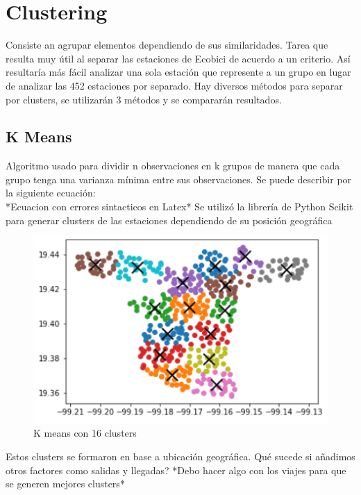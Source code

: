 \documentclass[12pt,spanish]{article}
\begin{document}
	\section{Clustering}
	Consiste an agrupar elementos dependiendo de sus similaridades. Tarea que resulta muy útil al separar las estaciones de Ecobici de acuerdo a un criterio. Así resultaría más fácil analizar una sola estación que represente a un grupo en lugar de analizar las 452 estaciones por separado. Hay diversos métodos para separar por clusters, se utilizarán 3 métodos y se compararán resultados.
	\subsection{K Means}
	Algoritmo usado para dividir n observaciones en k grupos de manera que cada grupo tenga una varianza mínima entre sus observaciones. Se puede describir por la siguiente ecuación:\\
	*Ecuacion con errores sintacticos en Latex*
	Se utilizó la librería de Python Scikit para generar clusters de las estaciones dependiendo de su posición geográfica
	\begin{figure}[H]
		\centering
		\includegraphics[width=15cm]{Imagenes/kmeans_16.png}
		\begin{centering}
			\caption{K means con 16 clusters}
		\end{centering}
	\end{figure}
	Estos clusters se formaron en base a ubicación geográfica. Qué sucede si añadimos otros factores como salidas y llegadas?
	*Debo hacer algo con los viajes para que se generen mejores clusters*
\end{document}

